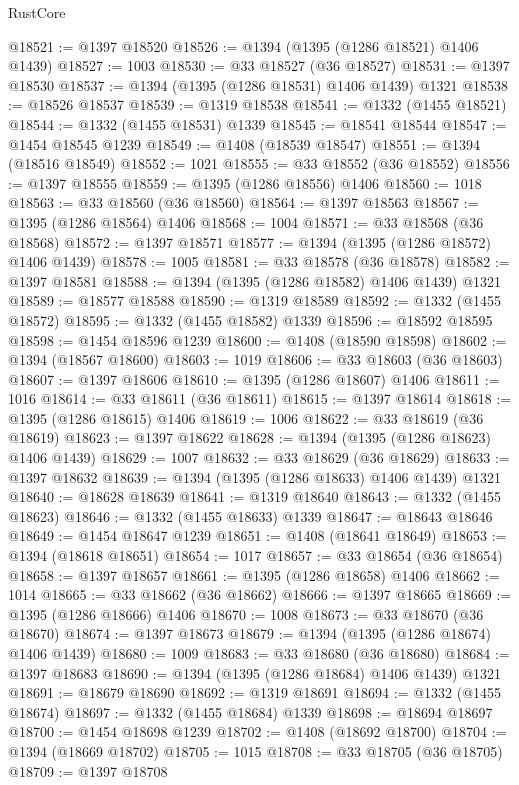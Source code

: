 \begin{lexlean}{RustCore}
\begin{coremodule}
@18521 := @1397 @18520
@18526 := @1394 (@1395 (@1286 @18521) @1406 @1439)
@18527 := 1003
@18530 := @33 @18527 (@36 @18527)
@18531 := @1397 @18530
@18537 := @1394 (@1395 (@1286 @18531) @1406 @1439) @1321
@18538 := @18526 @18537
@18539 := @1319 @18538
@18541 := @1332 (@1455 @18521)
@18544 := @1332 (@1455 @18531) @1339
@18545 := @18541 @18544
@18547 := @1454 @18545 @1239
@18549 := @1408 (@18539 @18547)
@18551 := @1394 (@18516 @18549)
@18552 := 1021
@18555 := @33 @18552 (@36 @18552)
@18556 := @1397 @18555
@18559 := @1395 (@1286 @18556) @1406
@18560 := 1018
@18563 := @33 @18560 (@36 @18560)
@18564 := @1397 @18563
@18567 := @1395 (@1286 @18564) @1406
@18568 := 1004
@18571 := @33 @18568 (@36 @18568)
@18572 := @1397 @18571
@18577 := @1394 (@1395 (@1286 @18572) @1406 @1439)
@18578 := 1005
@18581 := @33 @18578 (@36 @18578)
@18582 := @1397 @18581
@18588 := @1394 (@1395 (@1286 @18582) @1406 @1439) @1321
@18589 := @18577 @18588
@18590 := @1319 @18589
@18592 := @1332 (@1455 @18572)
@18595 := @1332 (@1455 @18582) @1339
@18596 := @18592 @18595
@18598 := @1454 @18596 @1239
@18600 := @1408 (@18590 @18598)
@18602 := @1394 (@18567 @18600)
@18603 := 1019
@18606 := @33 @18603 (@36 @18603)
@18607 := @1397 @18606
@18610 := @1395 (@1286 @18607) @1406
@18611 := 1016
@18614 := @33 @18611 (@36 @18611)
@18615 := @1397 @18614
@18618 := @1395 (@1286 @18615) @1406
@18619 := 1006
@18622 := @33 @18619 (@36 @18619)
@18623 := @1397 @18622
@18628 := @1394 (@1395 (@1286 @18623) @1406 @1439)
@18629 := 1007
@18632 := @33 @18629 (@36 @18629)
@18633 := @1397 @18632
@18639 := @1394 (@1395 (@1286 @18633) @1406 @1439) @1321
@18640 := @18628 @18639
@18641 := @1319 @18640
@18643 := @1332 (@1455 @18623)
@18646 := @1332 (@1455 @18633) @1339
@18647 := @18643 @18646
@18649 := @1454 @18647 @1239
@18651 := @1408 (@18641 @18649)
@18653 := @1394 (@18618 @18651)
@18654 := 1017
@18657 := @33 @18654 (@36 @18654)
@18658 := @1397 @18657
@18661 := @1395 (@1286 @18658) @1406
@18662 := 1014
@18665 := @33 @18662 (@36 @18662)
@18666 := @1397 @18665
@18669 := @1395 (@1286 @18666) @1406
@18670 := 1008
@18673 := @33 @18670 (@36 @18670)
@18674 := @1397 @18673
@18679 := @1394 (@1395 (@1286 @18674) @1406 @1439)
@18680 := 1009
@18683 := @33 @18680 (@36 @18680)
@18684 := @1397 @18683
@18690 := @1394 (@1395 (@1286 @18684) @1406 @1439) @1321
@18691 := @18679 @18690
@18692 := @1319 @18691
@18694 := @1332 (@1455 @18674)
@18697 := @1332 (@1455 @18684) @1339
@18698 := @18694 @18697
@18700 := @1454 @18698 @1239
@18702 := @1408 (@18692 @18700)
@18704 := @1394 (@18669 @18702)
@18705 := 1015
@18708 := @33 @18705 (@36 @18705)
@18709 := @1397 @18708

\end{coremodule}
\end{lexlean}
